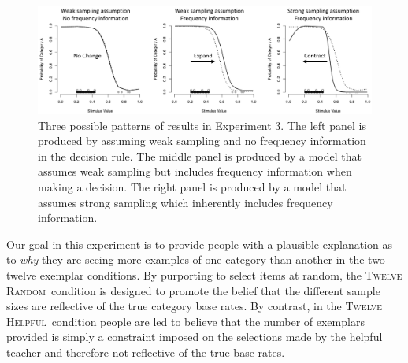 \documentclass[doc,apacite]{apa6}
\newcommand{\random}{\textsc{Twelve Random}}
\newcommand{\helpful}{\textsc{Twelve Helpful}}
\begin{document}
\begin{figure}[t]
\includegraphics[width=1.0\textwidth]{figures/exp3-predictions.png}
\vspace{-1mm}
\caption{%
Three possible patterns of results in Experiment 3.
The left panel is produced by assuming weak sampling and no frequency information in the decision rule.
The middle panel is produced by a model that assumes weak sampling but includes frequency information when making a decision.
The right panel is produced by a model that assumes strong sampling which inherently includes frequency information.
}
\label{fig:exp3-predictions}
\end{figure}


Our goal in this experiment is to provide people with a plausible explanation as to \textit{why} they are seeing more examples of one category than another in the two twelve exemplar conditions. By purporting to select items at random, the \random\ condition is designed to promote the belief that the different sample sizes are reflective of the true category base rates. By contrast, in the \helpful\ condition people are led to believe that the number of exemplars provided is simply a constraint imposed on the selections made by the helpful teacher and therefore not reflective of the true base rates.
\end{document}
